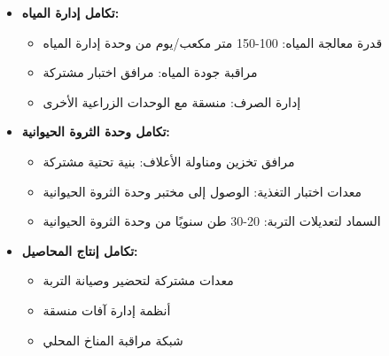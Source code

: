\begin{itemize}
    \item \textbf{تكامل إدارة المياه:}
    \begin{itemize}
        \item قدرة معالجة المياه: 100-150 متر مكعب/يوم من وحدة إدارة المياه
        \item مراقبة جودة المياه: مرافق اختبار مشتركة
        \item إدارة الصرف: منسقة مع الوحدات الزراعية الأخرى
    \end{itemize}
    \item \textbf{تكامل وحدة الثروة الحيوانية:}
    \begin{itemize}
        \item مرافق تخزين ومناولة الأعلاف: بنية تحتية مشتركة
        \item معدات اختبار التغذية: الوصول إلى مختبر وحدة الثروة الحيوانية
        \item السماد لتعديلات التربة: 20-30 طن سنويًا من وحدة الثروة الحيوانية
    \end{itemize}
    \item \textbf{تكامل إنتاج المحاصيل:}
    \begin{itemize}
        \item معدات مشتركة لتحضير وصيانة التربة
        \item أنظمة إدارة آفات منسقة
        \item شبكة مراقبة المناخ المحلي
    \end{itemize}
\end{itemize}
